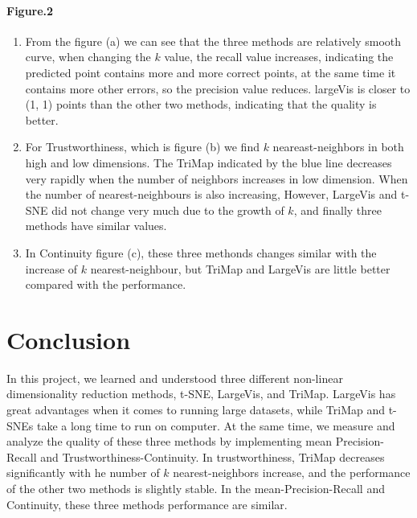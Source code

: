 \documentclass[12pt]{article}
\begin{document}
\paragraph*{Figure.2}
\begin{enumerate}
	\item From the figure (a) we can see that the three methods are relatively smooth curve, when changing the $k$ value, the recall value increases, indicating the predicted point contains more and more correct points, at the same time it contains more other errors, so the precision value reduces. largeVis is closer to (1, 1) points than the other two methods, indicating that the quality is better.
	\item For Trustworthiness, which is figure (b) we find $k$ neareast-neighbors in both high and low dimensions. The TriMap indicated by the blue line decreases very rapidly when the number of neighbors increases in low dimension. When the number of nearest-neighbours is also increasing, However, LargeVis and t-SNE did not change very much due to the growth of $k$, and finally three methods have similar values.
	\item In Continuity figure (c), these three methonds changes similar with the increase of $k$ nearest-neighbour, but TriMap and LargeVis are little better compared with the performance.
\end{enumerate}

\section*{Conclusion}
In this project, we learned and understood three different non-linear dimensionality reduction methods, t-SNE, LargeVis, and TriMap. LargeVis has great advantages when it comes to running large datasets, while TriMap and t-SNEs take a long time to run on computer. At the same time, we measure and analyze the quality of these three methods by implementing mean Precision-Recall and Trustworthiness-Continuity. In trustworthiness, TriMap decreases significantly with he number of $k$ nearest-neighbors increase, and the performance of the other two methods is slightly stable. In the mean-Precision-Recall and Continuity, these three methods performance are similar.


\clearpage
\end{document}
